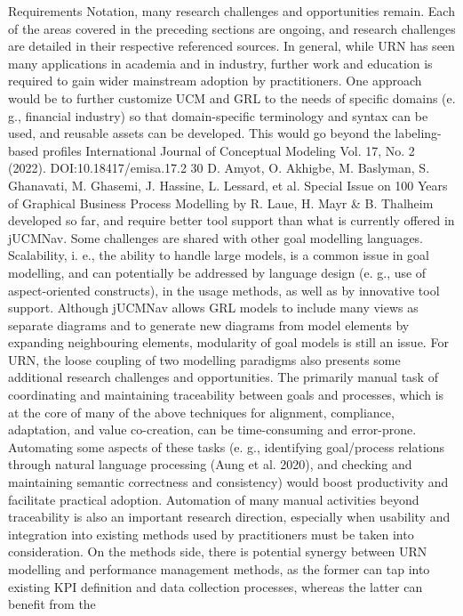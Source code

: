 Requirements Notation, many research challenges
and opportunities remain. Each of the areas covered in the preceding sections are ongoing, and
research challenges are detailed in their respective
referenced sources.
In general, while URN has seen many applications in academia and in industry, further work and
education is required to gain wider mainstream
adoption by practitioners. One approach would be
to further customize UCM and GRL to the needs
of specific domains (e. g., financial industry) so
that domain-specific terminology and syntax can
be used, and reusable assets can be developed.
This would go beyond the labeling-based profiles
International Journal of Conceptual Modeling
Vol. 17, No. 2 (2022). DOI:10.18417/emisa.17.2
30 D. Amyot, O. Akhigbe, M. Baslyman, S. Ghanavati, M. Ghasemi, J. Hassine, L. Lessard, et al.
Special Issue on 100 Years of Graphical Business Process Modelling by R. Laue, H. Mayr & B. Thalheim
developed so far, and require better tool support
than what is currently offered in jUCMNav.
Some challenges are shared with other goal
modelling languages. Scalability, i. e., the ability to handle large models, is a common issue in
goal modelling, and can potentially be addressed
by language design (e. g., use of aspect-oriented
constructs), in the usage methods, as well as by innovative tool support. Although jUCMNav allows
GRL models to include many views as separate
diagrams and to generate new diagrams from
model elements by expanding neighbouring elements, modularity of goal models is still an issue.
For URN, the loose coupling of two modelling
paradigms also presents some additional research
challenges and opportunities.
The primarily manual task of coordinating and
maintaining traceability between goals and processes, which is at the core of many of the above
techniques for alignment, compliance, adaptation,
and value co-creation, can be time-consuming
and error-prone. Automating some aspects of
these tasks (e. g., identifying goal/process relations through natural language processing (Aung
et al. 2020), and checking and maintaining semantic correctness and consistency) would boost
productivity and facilitate practical adoption.
Automation of many manual activities beyond
traceability is also an important research direction,
especially when usability and integration into
existing methods used by practitioners must be
taken into consideration.
On the methods side, there is potential synergy between URN modelling and performance
management methods, as the former can tap into
existing KPI definition and data collection processes, whereas the latter can benefit from the
